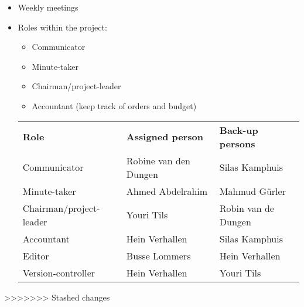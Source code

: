 \begin{itemize}
	\setlength\itemsep{-0.3em}
	\item Weekly meetings
	\item Roles within the project:
	\begin{itemize}
		\setlength\itemsep{-0.3em}
		\item Communicator
		\item Minute-taker
		\item Chairman/project-leader
		\item Accountant (keep track of orders and budget)
	\end{itemize}
	
	\begin{table}[!h]
\begin{tabular}{|l|l|l|}
\hline
\textbf{Role}           & \textbf{Assigned person} & \textbf{Back-up persons} \\
Communicator            & Robine van den Dungen    & Silas Kamphuis           \\
Minute-taker            & Ahmed Abdelrahim         & Mahmud Gürler            \\
Chairman/project-leader & Youri Tils               & Robin van de Dungen      \\
Accountant              & Hein Verhallen           & Silas Kamphuis           \\
Editor                  & Busse Lommers            & Hein Verhallen           \\
Version-controller      & Hein Verhallen           & Youri Tils              
\end{tabular}

\end{table}

\end{itemize}
>>>>>>> Stashed changes
